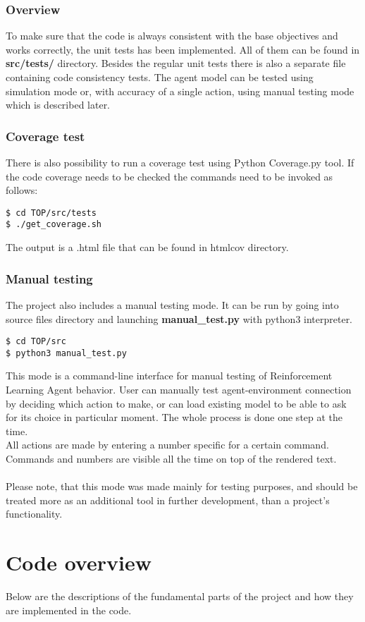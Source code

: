 \documentclass{article}
\begin{document}
\subsubsection{Overview}
To make sure that the code is always consistent with the base objectives and works correctly, the unit tests has been implemented. All of them can be found in \textbf{src/tests/} directory. Besides the regular unit tests there is also a separate file containing code consistency tests.
	The agent model can be tested using simulation mode or, with accuracy of a single action, using manual testing mode which is described later.

\subsubsection{Coverage test}
There is also possibility to run a coverage test using Python Coverage.py tool. If the code coverage needs to be checked the commands need to be invoked as follows:
\begin{lstlisting}
$ cd TOP/src/tests
$ ./get_coverage.sh
\end{lstlisting}
The output is a .html file that can be found in htmlcov directory.

\subsubsection{Manual testing}
The project also includes a manual testing mode. It can be run by going into source files directory and launching \textbf{manual\_test.py} with python3 interpreter. 
\begin{lstlisting}
$ cd TOP/src
$ python3 manual_test.py
\end{lstlisting}
This mode is a command-line interface for manual testing of Reinforcement Learning Agent behavior. User can manually test agent-environment connection by deciding which action to make, or can load existing model to be able to ask for its choice in particular moment. The whole process is done one step at the time.\\
All actions are made by entering a number specific for a certain command. Commands and numbers are visible all the time on top of the rendered text. \\\\
Please note, that this mode was made mainly for testing purposes, and should be treated more as an additional tool in further development, than a project's functionality.
\newpage
\section{Code overview}
Below are the descriptions of the fundamental parts of the project and how they are implemented in the code.
\end{document}
